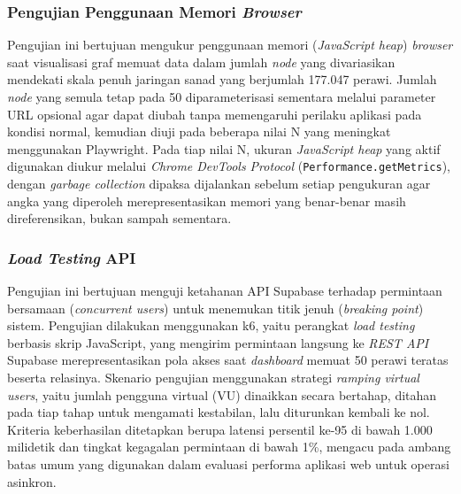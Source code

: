 \subsubsection{Pengujian Penggunaan Memori \textit{Browser}}
Pengujian ini bertujuan mengukur penggunaan memori (\textit{JavaScript heap}) \textit{browser} saat visualisasi graf memuat data dalam jumlah \textit{node} yang divariasikan mendekati skala penuh jaringan sanad yang berjumlah 177.047 perawi. Jumlah \textit{node} yang semula tetap pada 50 diparameterisasi sementara melalui parameter URL opsional agar dapat diubah tanpa memengaruhi perilaku aplikasi pada kondisi normal, kemudian diuji pada beberapa nilai N yang meningkat menggunakan Playwright. Pada tiap nilai N, ukuran \textit{JavaScript heap} yang aktif digunakan diukur melalui \textit{Chrome DevTools Protocol} (\texttt{Performance.getMetrics}), dengan \textit{garbage collection} dipaksa dijalankan sebelum setiap pengukuran agar angka yang diperoleh merepresentasikan memori yang benar-benar masih direferensikan, bukan sampah sementara.

\subsubsection{\textit{Load Testing} API}
Pengujian ini bertujuan menguji ketahanan API Supabase terhadap permintaan bersamaan (\textit{concurrent users}) untuk menemukan titik jenuh (\textit{breaking point}) sistem. Pengujian dilakukan menggunakan k6, yaitu perangkat \textit{load testing} berbasis skrip JavaScript, yang mengirim permintaan langsung ke \textit{REST API} Supabase merepresentasikan pola akses saat \textit{dashboard} memuat 50 perawi teratas beserta relasinya. Skenario pengujian menggunakan strategi \textit{ramping virtual users}, yaitu jumlah pengguna virtual (VU) dinaikkan secara bertahap, ditahan pada tiap tahap untuk mengamati kestabilan, lalu diturunkan kembali ke nol. Kriteria keberhasilan ditetapkan berupa latensi persentil ke-95 di bawah 1.000 milidetik dan tingkat kegagalan permintaan di bawah 1\%, mengacu pada ambang batas umum yang digunakan dalam evaluasi performa aplikasi web untuk operasi asinkron.

